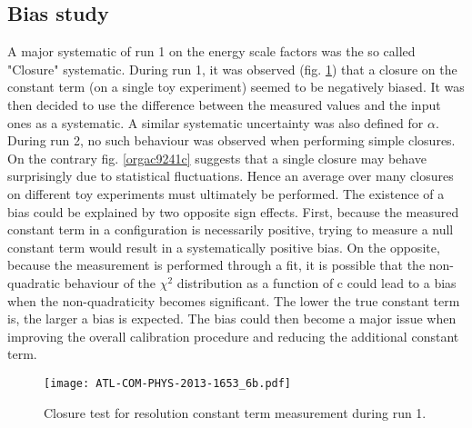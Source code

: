 \subsection{Bias study}
\label{sec:orgd804911}
\label{sec:Calibration_inSitu_BiasInput}

A major systematic of run 1 on the energy scale factors was the so called "Closure" systematic.
During run 1, it was observed \cite{ATL-COM-PHYS-2013-1653} (fig. \ref{fig:orgc7de0ae}) that a closure on the constant term (on a single toy experiment) seemed to be negatively biased.
It was then decided to use the difference between the measured values and the input ones as a systematic.
A similar systematic uncertainty was also defined for \(\alpha\).
During run 2, no such behaviour was observed when performing simple closures.
On the contrary fig. \ref{orgac9241c} suggests that a single closure may behave surprisingly due to statistical fluctuations.
Hence an average over many closures on different toy experiments must ultimately be performed.
The existence of a bias could be explained by two opposite sign effects.
First, because the measured constant term in a configuration is necessarily positive, trying to measure a null constant term would result in a systematically positive bias.
On the opposite, because the measurement is performed through a fit, it is possible that the non-quadratic behaviour of the $\chi^2$ distribution as a function of c could lead to a bias when the non-quadraticity becomes significant.
The lower the true constant term is, the larger a bias is expected.
The bias could then become a major issue when improving the overall calibration procedure and reducing the additional constant term.

\begin{figure}[htbp]
\centering
\texttt{[image: ATL-COM-PHYS-2013-1653\_6b.pdf]}
\caption{\label{fig:orgc7de0ae}
Closure test for resolution constant term measurement during run 1.\cite{ATL-COM-PHYS-2013-1653}}
\end{figure}

